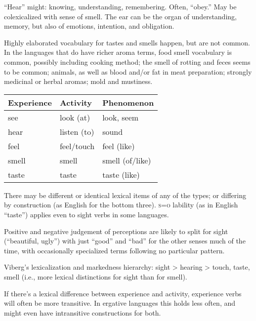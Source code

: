 \documentclass[11pt]{article}
\newcommand{\I}[1]{\textsc{#1}}   %
\begin{document}
``Hear'' might: knowing, understanding, remembering.  Often, ``obey.''
May be colexicalized with sense of smell.  The ear can be the organ of
understanding, memory, but also of emotions, intention, and obligation.

Highly elaborated vocabulary for tastes and smells happen, but are not
common.  In the languages that do have richer aroma terms, food smell
vocabulary is common, possibly including cooking method; the smell of
rotting and feces seems to be common; animals, as well as blood and/or
fat in meat preparation; strongly medicinal or herbal aromas; mold and
mustiness.

\begin{center}
  \begin{tabular}{lll}
    Experience & Activity & Phenomenon \\
    \hline
    see & look (at) & look, seem \\
    hear & listen (to) & sound \\
    feel & feel/touch & feel (like) \\
    smell & smell & smell (of/like) \\
    taste & taste & taste (like)
  \end{tabular}
\end{center}

There may be different or identical lexical items of any of the types;
or differing by construction (as English for the bottom
three).  \I{s=o} lability (as in English ``taste'') applies even to
sight verbs in some languages.

Positive and negative judgement of perceptions are likely to split for
sight (``beautiful, ugly'') with just ``good'' and ``bad'' for the
other senses much of the time, with occasionally specialized terms
following no particular pattern.

Viberg's lexicalization and markedness hierarchy: sight > hearing >
touch, taste, smell (i.e., more lexical distinctions for sight than
for smell).


If there's a lexical difference between experience and activity,
experience verbs will often be more transitive.  In ergative
languages this holds less often, and might even have intransitive
constructions for both.
\end{document}
